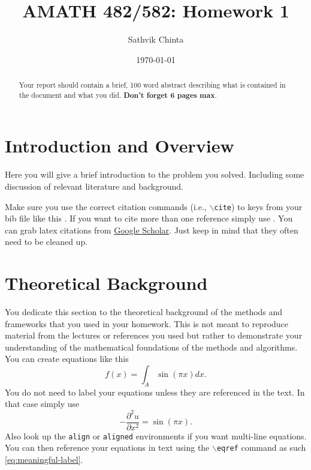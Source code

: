 \documentclass[11pt]{amsart}
\title{AMATH 482/582: Homework 1}
\author{Sathvik Chinta} %
\date{\today} %
\begin{document}
\maketitle 

\begin{abstract}
    Your report should contain a brief, 100 word abstract describing what is contained in 
    the document and what you did. {\bf Don't forget 6 pages max}.
\end{abstract}


\section{Introduction and Overview}\label{sec:Introduction}

Here you will give a brief introduction to the problem you solved. Including 
some discussion of relevant literature and background. 

Make sure you use the correct citation commands (i.e., \texttt{$\backslash$cite}) to keys 
from your bib file like this \cite{example-article-citation}. If you want 
to cite more than one reference simply use \cite{example-article-citation, example-book-citation}. You can grab latex citations 
from \href{https://scholar.google.com}{Google Scholar}. Just keep in mind that they often 
need to be cleaned up.

\section{Theoretical Background}\label{sec:theory}

You dedicate this section to the theoretical background of the methods and frameworks 
that you used in your homework. This is not meant to reproduce material from the lectures
 or references you used but rather to demonstrate your understanding of the 
 mathematical foundations of the methods and algorithms. You can create equations like this 
 \begin{equation*}
     f(x) = \int_A \sin( \pi x) dx.
 \end{equation*}
 You do not need to label your equations unless they are referenced in the text. In that 
 case simply use 
 \begin{equation}\label{eq:meaningful-label}
      - \frac{\partial^2 u}{\partial x^2} = \sin ( \pi x).
 \end{equation}
Also look up the \texttt{align} or \texttt{aligned} environments if you want multi-line 
equations. You can then reference your equations in text using the $\backslash$\texttt{eqref}
command as such \eqref{eq:meaningful-label}. 
\end{document}
